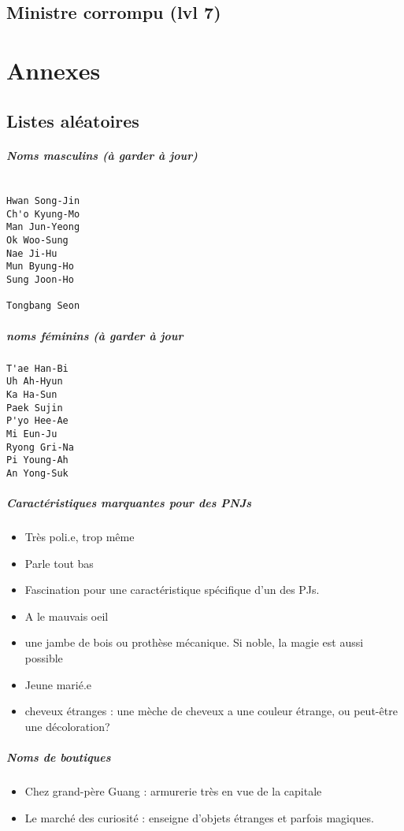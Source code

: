 \documentclass[10pt,a4paper]{book}
\begin{document}
\section{Ministre corrompu (lvl 7)}

\chapter*{Annexes}
\section*{Listes aléatoires}
\paragraph{Noms masculins (à garder à jour)}
\begin{verbatim}

Hwan Song-Jin
Ch'o Kyung-Mo
Man Jun-Yeong
Ok Woo-Sung
Nae Ji-Hu
Mun Byung-Ho
Sung Joon-Ho

Tongbang Seon
\end{verbatim}
\paragraph{noms féminins (à garder à jour}
\begin{verbatim}
T'ae Han-Bi
Uh Ah-Hyun
Ka Ha-Sun
Paek Sujin
P'yo Hee-Ae
Mi Eun-Ju
Ryong Gri-Na
Pi Young-Ah
An Yong-Suk
\end{verbatim}
\paragraph{Caractéristiques marquantes pour des PNJs}
\begin{itemize}
\item Très poli.e, trop même
\item Parle tout bas
\item Fascination pour une caractéristique spécifique d'un des PJs.
\item A le mauvais oeil
\item une jambe de bois ou prothèse mécanique. Si noble, la magie est aussi possible
\item Jeune marié.e
\item cheveux étranges : une mèche de cheveux a une couleur étrange, ou peut-être une décoloration?
\end{itemize}
\paragraph{Noms de boutiques}
\begin{itemize}
\item Chez grand-père Guang : armurerie très en vue de la capitale
\item Le marché des curiosité : enseigne d'objets étranges et parfois magiques.
\end{itemize}
\end{document}
